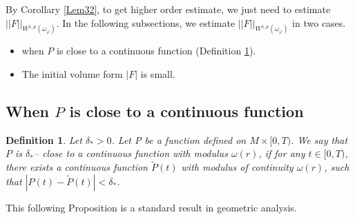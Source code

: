 \documentclass[11pt]{amsart}
\newtheorem{defn}[lem]{Definition}
\numberwithin{equation}{section}
\begin{document}
\noindent
By Corollary \ref{Lem32}, to get higher order estimate, we just need to estimate $||F||_{W^{1,p}(\omega_\varphi)}$. In the following subsections, we estimate $||F||_{W^{1,p}(\omega_\varphi)}$ in two cases.
	\begin{itemize}
		\item when $P$ is close to a continuous function (Definition \ref{Def31}). 
		\item The initial volume form $|F|$ is small.
	\end{itemize} 


\subsection{When $P$ is close to a continuous function}

\begin{defn}\label{Def31}
	Let $\delta_*>0$. Let P be a function defined on $M\times [0,T)$. We say that $P$ is $\delta_*$-- close to a continuous function with modulus $\omega(r)$, if for any $t\in [0,T)$, there exists a continuous function $\tilde{P}(t)$ with modulus of continuity $\omega(r)$, such that $|P(t)-\tilde{P}(t)|<\delta_*$. \\
\end{defn}
\noindent
This following Proposition is a standard result in geometric analysis.
\end{document}

